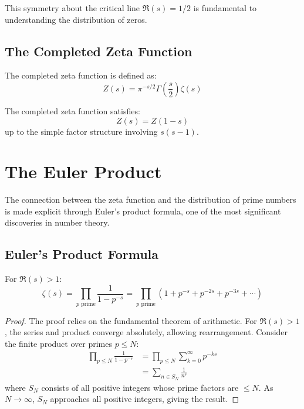 This symmetry about the critical line $\Re(s) = 1/2$ is fundamental to understanding the distribution of zeros.

\subsection{The Completed Zeta Function}

\begin{definition}
\label{def:completed_zeta}
The completed zeta function is defined as:
\begin{equation}
Z(s) = \pi^{-s/2} \Gamma\left(\frac{s}{2}\right) \zeta(s)
\label{eq:completed_zeta}
\end{equation}
\end{definition}

\begin{theorem}
The completed zeta function satisfies:
\begin{equation}
Z(s) = Z(1-s)
\end{equation}
up to the simple factor structure involving $s(s-1)$.
\end{theorem}

\section{The Euler Product}
\label{sec:euler_product}

The connection between the zeta function and the distribution of prime numbers is made explicit through Euler's product formula, one of the most significant discoveries in number theory.

\subsection{Euler's Product Formula}

\begin{theorem}
\label{thm:euler_product}
For $\Re(s) > 1$:
\begin{equation}
\zeta(s) = \prod_{p \text{ prime}} \frac{1}{1-p^{-s}} = \prod_{p \text{ prime}} \left(1 + p^{-s} + p^{-2s} + p^{-3s} + \cdots\right)
\label{eq:euler_product}
\end{equation}
\end{theorem}

\begin{proof}
The proof relies on the fundamental theorem of arithmetic. For $\Re(s) > 1$, the series and product converge absolutely, allowing rearrangement. Consider the finite product over primes $p \leq N$:
\begin{align}
\prod_{p \leq N} \frac{1}{1-p^{-s}} &= \prod_{p \leq N} \sum_{k=0}^{\infty} p^{-ks} \\
&= \sum_{n \in S_N} \frac{1}{n^s}
\end{align}
where $S_N$ consists of all positive integers whose prime factors are $\leq N$. As $N \to \infty$, $S_N$ approaches all positive integers, giving the result.
\end{proof}

